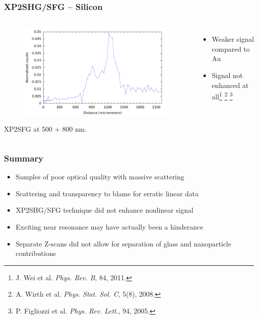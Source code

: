 \documentclass{beamer}
\begin{document}
\begin{frame}
\frametitle{XP2SHG/SFG -- Silicon}
\begin{columns}
\begin{center}
\begin{figure}
\includegraphics[width=\textwidth]{si_sfg_500+800}
\end{figure}
XP2SFG at 500 + 800 nm.
\end{center}
\begin{itemize}
\item Weaker signal compared to Au
\item Signal not enhanced at all\footnote{J. Wei et al. \emph{Phys. Rev. B}, 84, 2011.} \footnote{A. Wirth et al. \emph{Phys. Stat. Sol. C}, 5(8), 2008.} \footnote{P. Figliozzi et al. \emph{Phys. Rev. Lett.}, 94, 2005.}
\end{itemize}
\end{columns}
\end{frame}

\begin{frame}
\frametitle{Summary}
\begin{itemize}
\item Samples of poor optical quality with massive scattering
\item Scattering and transparency to blame for erratic linear data
\item XP2SHG/SFG technique did not enhance nonlinear signal
\item Exciting near resonance may have actually been a hinderance
\item Separate Z-scans did not allow for separation of glass and nanoparticle contributions
\end{itemize}
\end{frame}
\end{document}
